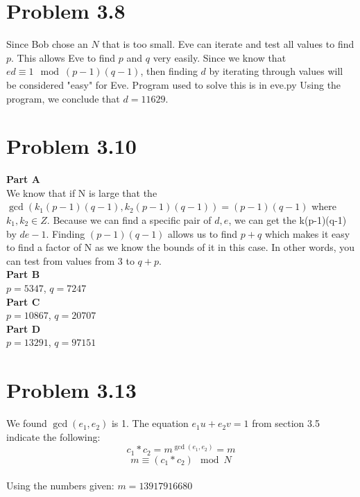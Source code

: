 \documentclass[10pt]{amsart}
\begin{document}
\section*{\large \textbf{Problem 3.8}}
\begin{addmargin}{8pt}
Since Bob chose an $N$ that is too small. Eve can iterate and test all values
to find $p$. This allows Eve to find $p$ and $q$ very easily. Since we know
that $ed \equiv 1 \mod (p-1)(q-1)$, then finding $d$ by iterating through values
will be considered "easy" for Eve. Program used to solve this is in eve.py
Using the program, we conclude that $d = 11629$. \\
\end{addmargin}

\section*{\large \textbf{Problem 3.10}}
\begin{addmargin}{8pt}
\textbf{\small Part A} \\
We know that if N is large that the
$\gcd(k_{1}(p-1)(q-1), k_{2}(p-1)(q-1)) = (p-1)(q-1)$
where $k_{1},k_{2} \in Z$. Because we can find a specific pair of
$d,e$, we can get the k(p-1)(q-1) by $de-1$. Finding $(p-1)(q-1)$ allows us
to find $p + q$ which makes it easy to find a factor of N as we know the
bounds of it in this case. In other words, you can test from values from
$3$ to $q + p$. \\

\noindent \textbf{\small Part B} \\
$p = 5347$,
$q = 7247$ \\

\noindent \textbf{\small Part C} \\
$p=10867$,
$q=20707$ \\

\noindent \textbf{\small Part D} \\
$p=13291$,
$q=97151$ \\
\end{addmargin}

\section*{\large \textbf{Problem 3.13}}
\begin{addmargin}{8pt}
We found $\gcd(e_{1},e_{2})$ is 1.
The equation $e_{1}u + e_{2}v = 1$ from section 3.5 indicate the following:
\[c_{1} * c_{2} = m^{\gcd(e_{1},e_{2})} = m\]
\[m \equiv (c_{1} * c_{2}) \mod N\] \\
Using the numbers given: $m = 13917916680$
\end{addmargin}
\end{document}
